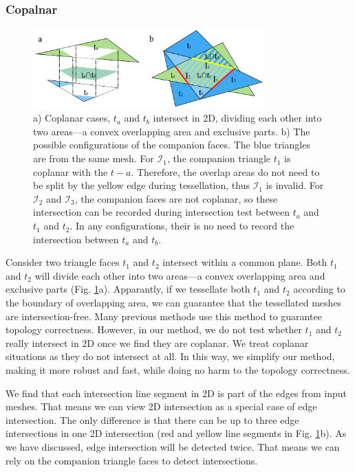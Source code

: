 \documentclass[10pt,journal,compsoc]{IEEEtran}
\begin{document}
\subsubsection{Copalnar}

\begin{figure}[t]
\centering
\includegraphics[width=3.5in]{boolean-03}
\caption{a) Coplanar cases, $t_a$ and $t_b$ intersect in 2D, dividing each other into two areas---a convex overlapping area and exclusive parts. b) The possible configurations of the companion faces. The blue triangles are from the same mesh. For $\mathcal{I}_1$, the companion triangle $t_1$ is coplanar with the $t-a$. Therefore, the overlap areas do not need to be split by the yellow edge during tessellation, thus $\mathcal{I}_1$ is invalid. For $\mathcal{I}_2$ and $\mathcal{I}_3$, the companion faces are not coplanar, so these intersection can be recorded during intersection test between $t_a$ and $t_1$ and $t_2$. In any configurations, their is no need to record the intersection between $t_a$ and $t_b$.}
\label{fig:coplanar}
\end{figure}

Consider two triangle faces $t_1$ and $t_2$ intersect within a common plane. Both $t_1$ and $t_2$ will divide each other into two areas---a convex overlapping area and exclusive parts (Fig. \ref{fig:coplanar}a). Apparantly, if we tessellate both $t_1$ and $t_2$ according to the boundary of overlapping area, we can guarantee that the tessellated meshes are intersection-free. Many previous methods \cite{feito2013fast,zhou2016mesh} use this method to guarantee topology correctness. However, in our method, we do not test whether $t_1$ and $t_2$ really intersect in 2D once we find they are coplanar. We treat coplanar situations as they do not intersect at all. In this way, we simplify our method, making it more robust and fast, while doing no harm to the topology correctness.

We find that each intersection line segment in 2D is part of the edges from input meshes. That means we can view 2D intersection as a special case of edge intersection. The only difference is that there can be up to three edge intersections in one 2D intersection (red and yellow line segments in Fig. \ref{fig:coplanar}b). As we have discussed, edge intersection will be detected twice. That means we can rely on the companion triangle faces to detect intersections.
\end{document}
